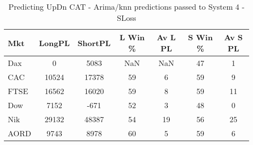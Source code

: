 \begin{table}[ht]
\centering
\caption[Predicting UpDn CAT - Arima/knn predictions passed to System 4 - SLoss]{Predicting UpDn CAT - Arima/knn predictions passed to System 4 - SLoss} 
\label{tab:chp_ts:pUD_CAT_arima_knn_sys_SL}
\begin{tabular}{lcccccc}
  \toprule Mkt & LongPL & ShortPL & L Win \% & Av L PL & S Win \% & Av S PL \\ 
  \midrule Dax & 0 & 5083 & NaN & NaN & 47 & 1 \\ 
  CAC & 10524 & 17378 & 59 & 6 & 59 & 9 \\ 
  FTSE & 16562 & 16020 & 59 & 8 & 59 & 11 \\ 
  Dow & 7152 & -671 & 52 & 3 & 48 & 0 \\ 
  Nik & 29132 & 48387 & 54 & 19 & 56 & 25 \\ 
  AORD & 9743 & 8978 & 60 & 5 & 59 & 6 \\ 
   \bottomrule \end{tabular}
\end{table}
